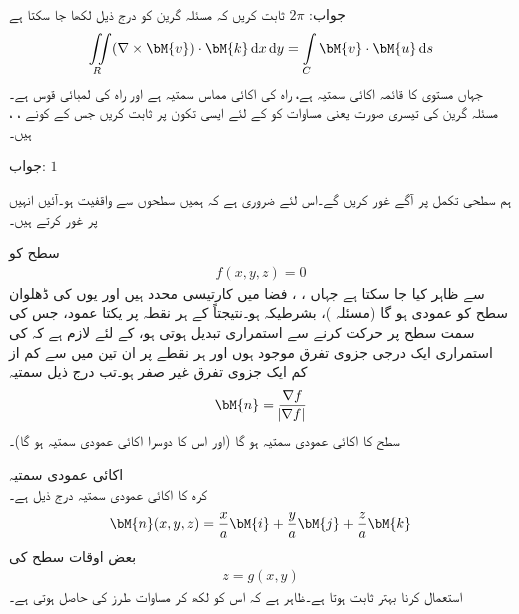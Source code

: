 جواب:\quad
$2\pi$
ثابت کریں کہ مسئلہ گرین کو درج ذیل لکھا جا سکتا ہے
\begin{align}\label{مساوات_خطی_تکمل_مسئلہ_گرین_تیسری_صورت}
\iint\limits_R (\nabla \times \bM{v}) \cdot \bM{k}\dif x\dif y=\int\limits_C \bM{v}\cdot \bM{u}\dif s
\end{align}
جہاں  مستوی  کا قائمہ اکائی سمتیہ ہے،  راہ  کی اکائی مماس سمتیہ ہے اور  راہ  کی لمبائی قوس ہے۔
مسئلہ گرین کی تیسری صورت یعنی مساوات  کو  کے لئے ایسی تکون پر ثابت کریں جس کے کونے ، ،  ہیں۔

جواب:\quad
$1$

ہم سطحی تکمل پر آگے غور کریں گے۔اس لئے ضروری ہے کہ ہمیں سطحوں سے واقفیت ہو۔آئیں انہیں پر غور کرتے ہیں۔

سطح  کو 
\begin{align}\label{مساوات_خطی_تکمل_سطح_خفی_روپ}
f(x,y,z)=0
\end{align}
سے ظاہر کیا جا سکتا ہے جہاں ، ،  فضا میں کارتیسی محدد ہیں اور یوں  کی ڈھلوان سطح  کو عمودی ہو گا (مسئلہ )، بشرطیکہ  ہو۔نتیجتاً  کے ہر نقطہ پر یکتا عمود، جس کی سمت سطح پر حرکت کرنے سے استمراری تبدیل ہوتی ہو، کے لئے لازم ہے کہ  کی استمراری ایک درجی جزوی تفرق موجود ہوں اور ہر نقطے پر ان تین میں سے کم از کم ایک جزوی تفرق غیر صفر ہو۔تب درج ذیل سمتیہ
\begin{align}
\bM{n}=\frac{\nabla f}{\abs{\nabla f}}
\end{align}
سطح  کا اکائی عمودی سمتیہ ہو گا (اور  اس کا دوسرا اکائی عمودی سمتیہ ہو گا)۔

\quad اکائی عمودی سمتیہ\\
کرہ  کا اکائی عمودی سمتیہ درج ذیل ہے۔
\begin{align*}
\bM{n}(x,y,z)=\frac{x}{a}\bM{i}+\frac{y}{a}\bM{j}+\frac{z}{a}\bM{k}
\end{align*}
بعض اوقات سطح کی 
\begin{align}\label{مساوات_خطی_تکمل_سطح_صریح_روپ}
z=g(x,y)
\end{align}
استعمال کرنا بہتر ثابت ہوتا ہے۔ظاہر ہے کہ اس کو  لکھ کر  مساوات  طرز  کی  حاصل ہوتی ہے۔

